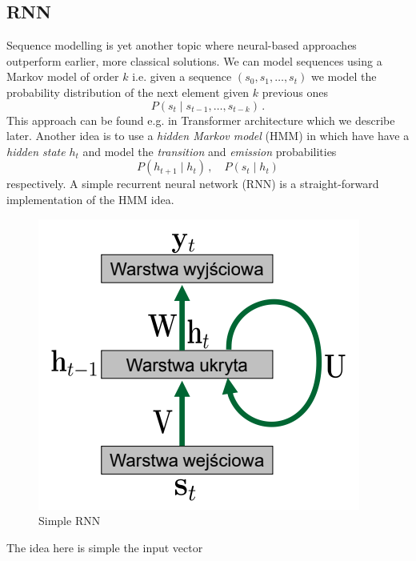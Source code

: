 \documentclass{myclass}
\begin{document}
\subsection{RNN}

Sequence modelling is yet another topic where neural-based approaches outperform earlier, more
classical solutions. We can model sequences using a Markov model of order $k$ i.e. given a sequence
$(s_0, s_1,\ldots,s_t)$ we model the probability distribution of the next element given $k$ previous
ones
\[
   P(s_t \mid s_{t-1}, \ldots, s_{t-k})\,.
\]
This approach can be found e.g. in Transformer architecture which we describe later. Another idea is
to use a \emph{hidden Markov model} (HMM) in which have have a \emph{hidden state} $h_t$ and model
the \emph{transition} and \emph{emission} probabilities
\[
   P(h_{t+1} \mid h_t)\,,\quad P(s_t \mid h_t)
\]
respectively. A simple recurrent neural network (RNN) is a straight-forward implementation of the
HMM idea.

\begin{figure}[ht]
   \centering
   \includegraphics[width=0.75\columnwidth]{figs/simple_rnn.png}
   \caption{Simple RNN}
   \label{fig:simple_rnn}
\end{figure}

The idea here is simple the input vector 
\end{document}
